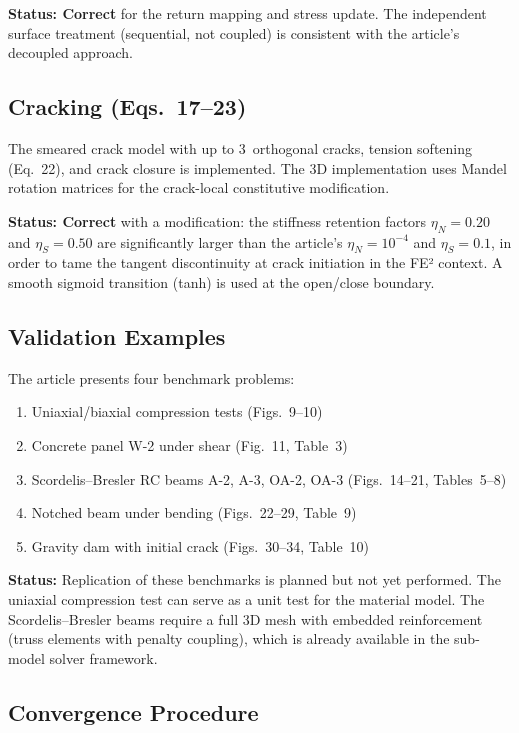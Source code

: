 \textbf{Status: Correct} for the return mapping and stress update.
The independent surface treatment (sequential, not coupled) is
consistent with the article's decoupled approach.

\subsection{Cracking (Eqs.~17--23)}

The smeared crack model with up to 3~orthogonal cracks, tension
softening (Eq.~22), and crack closure is implemented.  The 3D
implementation uses Mandel rotation matrices for the crack-local
constitutive modification.

\textbf{Status: Correct} with a modification: the stiffness
retention factors $\eta_N = 0.20$ and $\eta_S = 0.50$ are
significantly larger than the article's $\eta_N = 10^{-4}$ and
$\eta_S = 0.1$, in order to tame the tangent discontinuity at
crack initiation in the FE² context.  A smooth sigmoid transition
(tanh) is used at the open/close boundary.

\subsection{Validation Examples}

The article presents four benchmark problems:
\begin{enumerate}
  \item Uniaxial/biaxial compression tests (Figs.~9--10)
  \item Concrete panel W-2 under shear (Fig.~11, Table~3)
  \item Scordelis--Bresler RC beams A-2, A-3, OA-2, OA-3
    (Figs.~14--21, Tables~5--8)
  \item Notched beam under bending (Figs.~22--29, Table~9)
  \item Gravity dam with initial crack (Figs.~30--34, Table~10)
\end{enumerate}

\textbf{Status:} Replication of these benchmarks is
planned but not yet performed.  The uniaxial compression test can
serve as a unit test for the material model.  The Scordelis--Bresler
beams require a full 3D mesh with embedded reinforcement (truss
elements with penalty coupling), which is already available in the
sub-model solver framework.

\subsection{Convergence Procedure}

